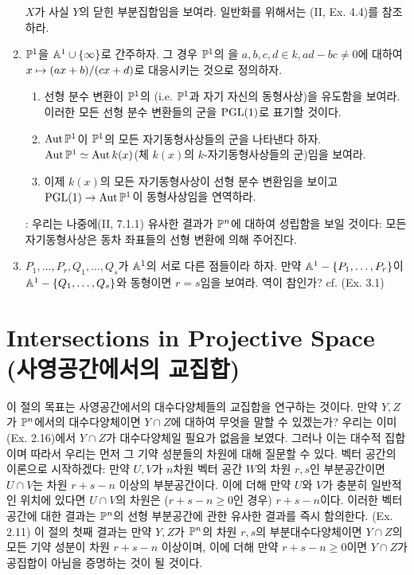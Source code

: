 \begin{enumerate}[label=\tb{6.\arabic*.},itemindent=0mm,itemsep=2mm]
	$X$가 사실 $Y$의 닫힌 부분집합임을 보여라. 일반화를 위해서는 (II, Ex. 4.4)를 참조하라.
	\item {} $\mathbb{P}^1$을 $\mathbb{A}^1\cup\{\infty\}$로 간주하자.
	그 경우 $\mathbb{P}^1$의 을
	$a,b,c,d\in k,ad-bc\ne 0$에 대하여 $x\mapsto(ax+b)/(cx+d)$로 대응시키는 것으로 정의하자.
	\begin{enumerate}[label=(\alph*)]
	\item 선형 분수 변환이 $\mathbb{P}^1$의 (i.e. $\mathbb{P}^1$과 자기 자신의 동형사상)을 유도함을 보여라.
	이러한 모든 선형 분수 변환들의 군을 $\mathrm{PGL}(1)$로 표기할 것이다.
	\item $\operatorname{Aut}\mathbb{P}^1$이 $\mathbb{P}^1$의 모든 자기동형사상들의 군을 나타낸다 하자.
	$\operatorname{Aut}\mathbb{P}^1\simeq\operatorname{Aut} k(x)$(체 $k(x)$의 $k$-자기동형사상들의 군)임을 보여라.
	\item 이제 $k(x)$의 모든 자기동형사상이 선형 분수 변환임을 보이고 $\mathrm{PGL}(1)\rightarrow\operatorname{Aut}\mathbb{P}^1$이 동형사상임을 연역하라.
	\end{enumerate}
	: 우리는 나중에(II, 7.1.1) 유사한 결과가 $\mathbb{P}^n$에 대하여 성립함을 보일 것이다:
	모든 자기동형사상은 동차 좌표들의 선형 변환에 의해 주어진다.
	\item $P_1,\ldots,P_r,Q_1,\ldots,Q_s$가 $\mathbb{A}^1$의 서로 다른 점들이라 하자.
	만약 $\mathbb{A}^1-\{P_1,\ldots,P_r\}$이 $\mathbb{A}^1-\{Q_1,\ldots,Q_s\}$와 동형이면 $r=s$임을 보여라. 역이 참인가? cf. (Ex. 3.1)
	\end{enumerate}
	
	
	
	\section{Intersections in Projective Space (사영공간에서의 교집합)}
	이 절의 목표는 사영공간에서의 대수다양체들의 교집합을 연구하는 것이다.
	만약 $Y,Z$가 $\mathbb{P}^n$에서의 대수다양체이면 $Y\cap Z$에 대하여 무엇을 말할 수 있겠는가?
	우리는 이미 (Ex. 2.16)에서 $Y\cap Z$가 대수다양체일 필요가 없음을 보였다.
	그러나 이는 대수적 집합이며 따라서 우리는 먼저 그 기약 성분들의 차원에 대해 질문할 수 있다.
	벡터 공간의 이론으로 시작하겠다: 만약 $U,V$가 $n$차원 벡터 공간 $W$의 차원 $r,s$인 부분공간이면
	$U\cap V$는 차원 $r+s-n$ 이상의 부분공간이다.
	이에 더해 만약 $U$와 $V$가 충분히 일반적인 위치에 있다면 $U\cap V$의 차원은 ($r+s-n\ge 0$인 경우) $r+s-n$이다.
	이러한 벡터 공간에 대한 결과는 $\mathbb{P}^n$의 선형 부분공간에 관한 유사한 결과를 즉시 함의한다. (Ex. 2.11)
	이 절의 첫째 결과는 만약 $Y,Z$가 $\mathbb{P}^n$의 차원 $r,s$의 부분대수다양체이면 $Y\cap Z$의 모든 기약 성분이 차원 $r+s-n$ 이상이며,
	이에 더해 만약 $r+s-n\ge 0$이면 $Y\cap Z$가 공집합이 아님을 증명하는 것이 될 것이다.
	
